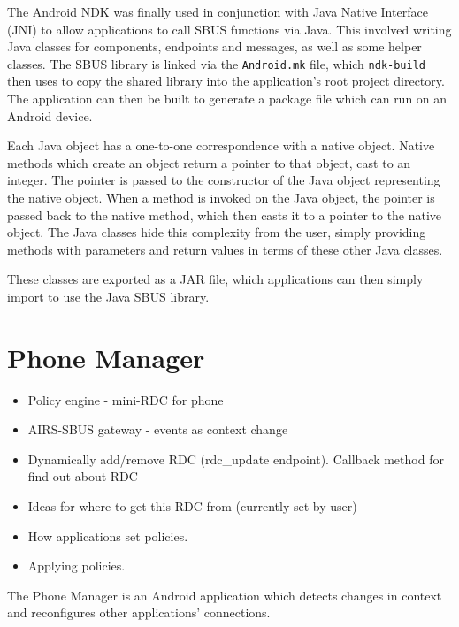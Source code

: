 \documentclass[12pt,twoside,notitlepage]{report}
\begin{document}
The Android NDK was finally used in conjunction with Java Native Interface (JNI) to allow applications to call SBUS functions via Java. 
This involved writing Java classes for components, endpoints and messages, as well as some helper classes. 
The SBUS library is linked via the {\tt Android.mk} file, which {\tt ndk-build} then uses to copy the shared library into the application's root project directory. 
The application can then be built to generate a package file which can run on an Android device.

Each Java object has a one-to-one correspondence with a native object. 
Native methods which create an object return a pointer to that object, cast to an integer. 
The pointer is passed to the constructor of the Java object representing the native object.
When a method is invoked on the Java object, the pointer is passed back to the native method, which then casts it to a pointer to the native object.
The Java classes hide this complexity from the user, simply providing methods with parameters and return values in terms of these other Java classes.

These classes are exported as a JAR file, which applications can then simply import to use the Java SBUS library.

\section{Phone Manager}

\begin{itemize}

\item Policy engine - mini-RDC for phone

\item AIRS-SBUS gateway - events as context change

\item Dynamically add/remove RDC (rdc\_update endpoint). Callback method for find out about RDC

\item Ideas for where to get this RDC from (currently set by user)

\item How applications set policies.

\item Applying policies.

\end{itemize}

The Phone Manager is an Android application which detects changes in context and reconfigures other applications' connections. 
\end{document}
